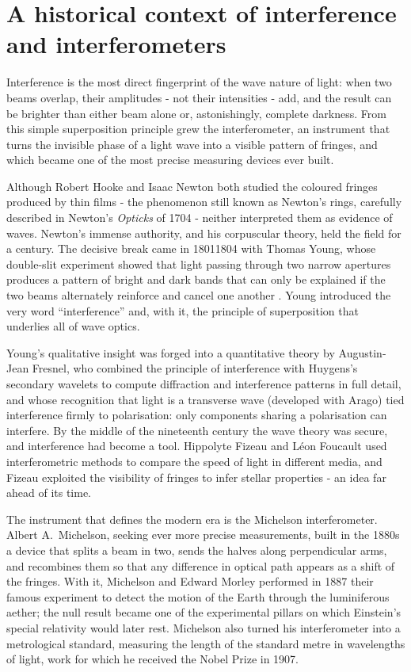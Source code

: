 \section{A historical context of interference and interferometers}

    Interference is the most direct fingerprint of the wave nature of light: when two beams
    overlap, their amplitudes - not their intensities - add, and the result can be brighter
    than either beam alone or, astonishingly, complete darkness. From this simple superposition
    principle grew the interferometer, an instrument that turns the invisible phase of a light
    wave into a visible pattern of fringes, and which became one of the most precise measuring
    devices ever built.

    Although Robert Hooke and Isaac Newton both studied the coloured fringes produced by thin
    films - the phenomenon still known as Newton's rings, carefully described in Newton's
    \textit{Opticks} of 1704 \cite{newton1704opticks} - neither interpreted them as evidence
    of waves. Newton's immense authority, and his corpuscular theory, held the field for a
    century. The decisive break came in 18011804 with Thomas Young, whose double-slit
    experiment showed that light passing through two narrow apertures produces a pattern of
    bright and dark bands that can only be explained if the two beams alternately reinforce and
    cancel one another \cite{young1804bakerian}. Young introduced the very word
    ``interference'' and, with it, the principle of superposition that underlies all of wave
    optics.

    Young's qualitative insight was forged into a quantitative theory by Augustin-Jean Fresnel,
    who combined the principle of interference with Huygens's secondary wavelets to compute
    diffraction and interference patterns in full detail, and whose recognition that light is a
    transverse wave (developed with Arago) tied interference firmly to polarisation: only
    components sharing a polarisation can interfere. By the middle of the nineteenth century the
    wave theory was secure, and interference had become a tool. Hippolyte Fizeau and Léon
    Foucault used interferometric methods to compare the speed of light in different media, and
    Fizeau exploited the visibility of fringes to infer stellar properties - an idea far ahead
    of its time.

    The instrument that defines the modern era is the Michelson interferometer. Albert A.\
    Michelson, seeking ever more precise measurements, built in the 1880s a device that splits
    a beam in two, sends the halves along perpendicular arms, and recombines them so that any
    difference in optical path appears as a shift of the fringes. With it, Michelson and Edward
    Morley performed in 1887 their famous experiment to detect the motion of the Earth through
    the luminiferous aether; the null result \cite{michelson1887relative} became one of the
    experimental pillars on which Einstein's special relativity would later rest. Michelson also
    turned his interferometer into a metrological standard, measuring the length of the standard
    metre in wavelengths of light, work for which he received the Nobel Prize in 1907.

